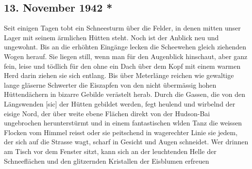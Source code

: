 \subsection{13. November 1942 *}

Seit einigen Tagen tobt ein Schneesturm \"{u}ber die Felder, in denen mitten unser Lager mit seinem \"{a}rmlichen H\"{u}tten steht.
Noch ist der Anblick neu und ungewohnt.
Bis an die erh\"{o}hten Eing\"{a}nge lecken die Scheewehen gleich ziehenden Wogen herauf.
Sie liegen still, wenn man f\"{u}r den Augenblick hinschaut, aber ganz fein, leise und t\"{o}dlich f\"{u}r den ohne ein Dach \"{u}ber dem Kopf mit einem warmen Herd darin ziehen sie sich entlang.
Bis \"{u}ber Meterl\"{a}nge reichen wie gewaltige lange gl\"{a}serne Schwerter die Eiszapfen von den nicht \"{u}berm\"{a}ssig hohen H\"{u}ttend\"{a}chern in bizarre Gebilde ver\"{a}stelt herab.
Durch die Gassen, die von den L\"{a}ngswenden{\color{red} [sic] } der H\"{u}tten gebildet werden, fegt heulend und wirbelnd der eisige Nord, der \"{u}ber weite ebene Fl\"{a}chen direkt von der Hudson-Bai ungebrochen herunterst\"{u}rmt und in einem fantastischen wlden Tanz die weissen Flocken vom Himmel reisst oder sie peitschend in wagerechter Linie sie jedem, der sich auf die Strasse wagt, scharf in Gesicht und Augen schneidet.
Wer drinnen am Tisch vor dem Fenster sitzt, kann sich an der leuchtenden Helle der Schneefl\"{a}chen und den glitzernden Kristallen der Eisblumen erfreuen

\clearpage
